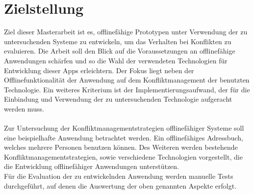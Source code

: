 \section{Zielstellung}
Ziel dieser Masterarbeit ist es, offlinefähige Prototypen unter Verwendung der zu untersuchenden Systeme zu entwickeln, um das Verhalten bei Konflikten zu evaluieren.
Die Arbeit soll den Blick auf die Voraussetzungen an offlinefähige Anwendungen schärfen und so die Wahl der verwendeten Technologien für Entwicklung dieser \glspl{App} erleichtern.
Der Fokus liegt neben der Offlinefunktionalität der Anwendung auf dem Konfliktmanagement der benutzten Technologie.
Ein weiteres Kriterium ist der Implementierungsaufwand, der für die Einbindung und Verwendung der zu untersuchenden Technologie aufgeracht werden muss.\\\\
%
Zur Untersuchung der Konfliktmanagementstrategien offlinefähiger Systeme soll eine beispielhafte Anwendung betrachtet werden. Ein offlinefähiges Adressbuch, welches mehrere Personen benutzen können.
Des Weiteren werden bestehende Konfliktmanagementstrategien, sowie verschiedene Technologien vorgestellt, die die Entwicklung offlinefähiger Anwendungen unterstützen.\\
Für die Evaluation der zu entwickelnden Anwendung werden manuelle Tests durchgeführt, auf denen die Auswertung der oben genannten Aspekte erfolgt.